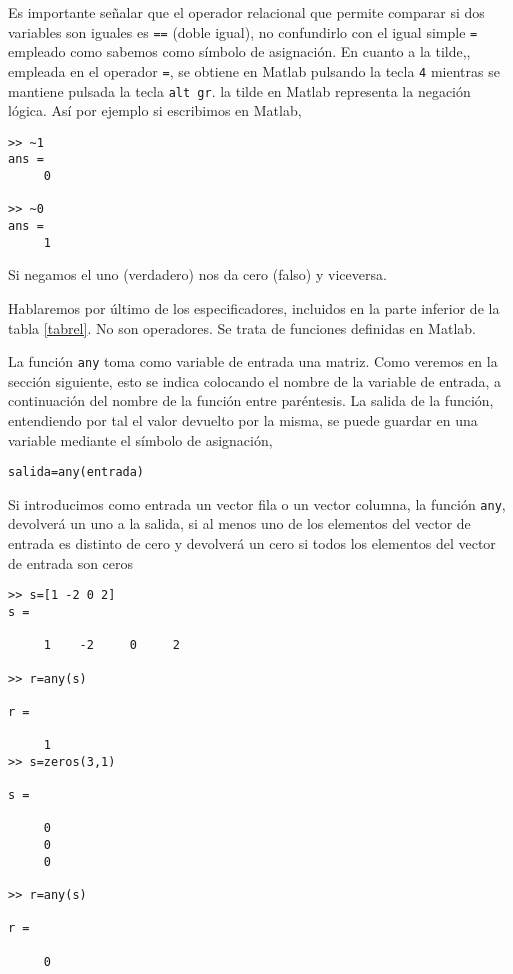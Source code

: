 Es importante señalar que el operador relacional que permite comparar si dos variables son iguales es \texttt{==} (doble igual), no confundirlo con el igual simple \texttt{=} empleado como sabemos como símbolo de asignación.
En cuanto a la tilde,\texttildelow , empleada en el operador \texttt{\texttildelow=}, se obtiene en Matlab pulsando la tecla \texttt{4} mientras se mantiene pulsada la tecla \texttt{alt gr}. la tilde en Matlab representa la negación lógica. Así por ejemplo si escribimos en Matlab,
\begin{verbatim}
>> ~1
ans =
     0
     
>> ~0
ans =
     1
\end{verbatim}
Si negamos el uno (verdadero) nos da cero (falso) y viceversa.

Hablaremos por último de los especificadores, incluidos en la parte inferior de la tabla \ref{tabrel}. No son operadores. Se trata de funciones definidas en Matlab.

La función \texttt{any} toma como variable de entrada una matriz. Como veremos en la sección siguiente, esto se indica colocando el nombre de la variable de entrada, a continuación del nombre de la función entre paréntesis. La salida de la función, entendiendo por tal el valor devuelto por la misma, se puede guardar en una variable mediante el símbolo de asignación,

\begin{verbatim}
salida=any(entrada)
\end{verbatim}

Si introducimos como entrada un vector fila o un vector columna, la función \texttt{any}, devolverá un uno a la salida, si al menos uno de los elementos del vector de entrada es distinto de cero y devolverá un cero si todos los elementos del vector de entrada son ceros 
\begin{verbatim}
>> s=[1 -2 0 2]
s =

     1    -2     0     2

>> r=any(s)

r =

     1
>> s=zeros(3,1)

s =

     0
     0
     0

>> r=any(s)

r =

     0
\end{verbatim}

